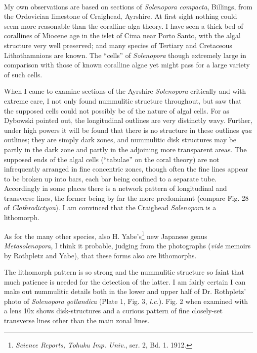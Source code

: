 \documentclass[a4paper, 12pt, oneside]{article}
\begin{document}
\paragraph{}
My own observations are based on sections of \emph{Solenopora compacta}, Billings, from the Ordovician limestone of Craighead, Ayrshire. At first sight nothing could seem more reasonable than the coralline-alga theory. I have seen a thick bed of corallines of Miocene age in the islet of Cima near Porto Santo, with the algal structure very well preserved; and many species of Tertiary and Cretaceous Lithothamnions are known. The ``cells'' of \emph{Solenopora} though extremely large in comparison with those of known coralline algae yet might pass for a large variety of such cells.

When I came to examine sections of the Ayrshire \emph{Solenopora} critically and with extreme care, I not only found nummulitic structure throughout, but saw that the supposed cells could not possibly be of the nature of algal cells. For as Dybowski pointed out, the longitudinal outlines are very distinctly wavy. Further, under high powers it will be found that there is no structure in these outlines \emph{qua} outlines; they are simply dark zones, and nummulitic disk structures may be partly in the dark zone and partly in the adjoining more transparent areas. The supposed ends of the algal cells (``tabulae'' on the coral theory) are not infrequently arranged in fine concentric zones, though often the fine lines appear to be broken up into bars, each bar being confined to a separate tube. Accordingly in some places there is a network pattern of longitudinal and transverse lines, the former being by far the more predominant (compare Fig. 28 of \emph{Clathrodictyon}). I am convinced that the Craighead \emph{Solenopora} is a lithomorph.

As for the many other species, also H. Yabe's\footnote{\emph{Science Reports, Tohuku Imp. Univ.}, ser. 2, Bd. 1. 1912.} new Japanese genus \emph{Metasolenopora}, I think it probable, judging from the photographs (\emph{vide} memoirs by Rothpletz and Yabe), that these forms also are lithomorphs.

The lithomorph pattern is so strong and the nummulitic structure so faint that much patience is needed for the detection of the latter. I am fairly certain I can make out nummulitic details both in the lower and upper half of Dr. Rothpletz' photo of \emph{Solenopora gotlandica} (Plate 1, Fig. 3, \emph{l.c.}). Fig. 2 when examined with a lens 10x shows disk-structures and a curious pattern of fine closely-set transverse lines other than the main zonal lines.
\end{document}
